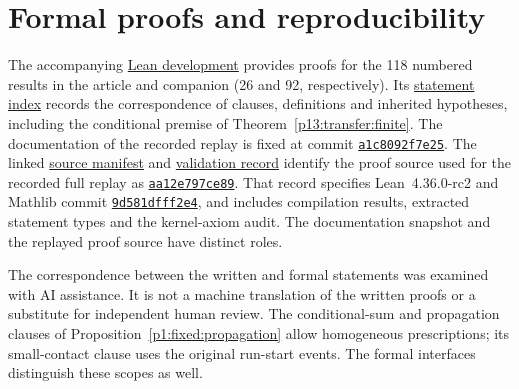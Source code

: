 \section*{Formal proofs and reproducibility}
The accompanying
\href{https://github.com/Vulkin-prog/paper-p1-lean}{Lean development}
provides proofs for the 118 numbered results in the article and companion
(26 and 92, respectively). Its
\href{https://github.com/Vulkin-prog/paper-p1-lean/blob/e564207ab543c7c0967e34b52f3d456d7a8f302c/docs/manuscript-results-publication-2026-11-12.json}{statement index}
records the correspondence of clauses, definitions and inherited
hypotheses, including the conditional premise of
Theorem~\ref{p13:transfer:finite}.
The documentation of the recorded replay is fixed at commit
\href{https://github.com/Vulkin-prog/paper-p1-lean/tree/a1c8092f7e25acf7f3b78283039cfbd69491f88e}{\texttt{a1c8092f7e25}}.
The linked
\href{https://github.com/Vulkin-prog/paper-p1-lean/blob/a1c8092f7e25acf7f3b78283039cfbd69491f88e/docs/validation/v2.0/proof-source-manifest.json}{source manifest}
and
\href{https://github.com/Vulkin-prog/paper-p1-lean/blob/a1c8092f7e25acf7f3b78283039cfbd69491f88e/docs/validation/v2.0/validation.json}{validation record}
identify the proof source used for the recorded full replay as
\href{https://github.com/Vulkin-prog/paper-p1-lean/tree/aa12e797ce895f6b7aef6e4f1f0c6e5e9a58aab4}{\texttt{aa12e797ce89}}.
That record specifies Lean~4.36.0-rc2 and Mathlib commit
\href{https://github.com/leanprover-community/mathlib4/tree/9d581dfff2e41de989072ea63abf3daf69311520}{\texttt{9d581dfff2e4}},
and includes compilation results, extracted statement types and the
kernel-axiom audit. The documentation snapshot and the replayed proof
source have distinct roles.

The correspondence between the written and formal statements was
examined with AI assistance. It is not a machine translation of the
written proofs or a substitute for independent human review.
The conditional-sum and propagation clauses of
Proposition~\ref{p1:fixed:propagation} allow homogeneous prescriptions;
its small-contact clause uses the original run-start events. The formal
interfaces distinguish these scopes as well.

